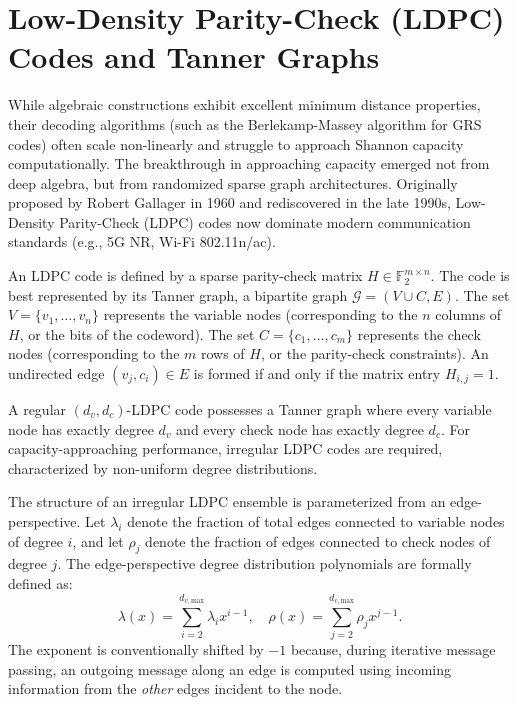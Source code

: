 \section{Low-Density Parity-Check (LDPC) Codes and Tanner Graphs}

While algebraic constructions exhibit excellent minimum distance properties, their decoding algorithms (such as the Berlekamp-Massey algorithm for GRS codes) often scale non-linearly and struggle to approach Shannon capacity computationally. The breakthrough in approaching capacity emerged not from deep algebra, but from randomized sparse graph architectures. Originally proposed by Robert Gallager in 1960 and rediscovered in the late 1990s, Low-Density Parity-Check (LDPC) codes now dominate modern communication standards (e.g., 5G NR, Wi-Fi 802.11n/ac).

\begin{definition}
An LDPC code is defined by a sparse parity-check matrix $H \in \mathbb{F}_2^{m \times n}$. The code is best represented by its Tanner graph, a bipartite graph $\mathcal{G} = (V \cup C, E)$.
The set $V = \{v_1, \dots, v_n\}$ represents the variable nodes (corresponding to the $n$ columns of $H$, or the bits of the codeword). The set $C = \{c_1, \dots, c_m\}$ represents the check nodes (corresponding to the $m$ rows of $H$, or the parity-check constraints). An undirected edge $(v_j, c_i) \in E$ is formed if and only if the matrix entry $H_{i,j} = 1$.
\end{definition}

A regular $(d_v, d_c)$-LDPC code possesses a Tanner graph where every variable node has exactly degree $d_v$ and every check node has exactly degree $d_c$. For capacity-approaching performance, irregular LDPC codes are required, characterized by non-uniform degree distributions.

\begin{definition}
The structure of an irregular LDPC ensemble is parameterized from an edge-perspective. Let $\lambda_i$ denote the fraction of total edges connected to variable nodes of degree $i$, and let $\rho_j$ denote the fraction of edges connected to check nodes of degree $j$. The edge-perspective degree distribution polynomials are formally defined as:
\[
\lambda(x) = \sum_{i=2}^{d_{v,\text{max}}} \lambda_i x^{i-1}, \quad \rho(x) = \sum_{j=2}^{d_{c,\text{max}}} \rho_j x^{j-1}.
\]
The exponent is conventionally shifted by $-1$ because, during iterative message passing, an outgoing message along an edge is computed using incoming information from the \textit{other} edges incident to the node.
\end{definition}

